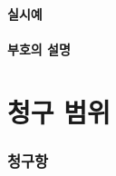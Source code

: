 \documentclass{article}
\begin{document}
\subsection{실시예}

\subsection{부호의 설명}




\part{청구 범위}

\section*{청구항}
\end{document}
